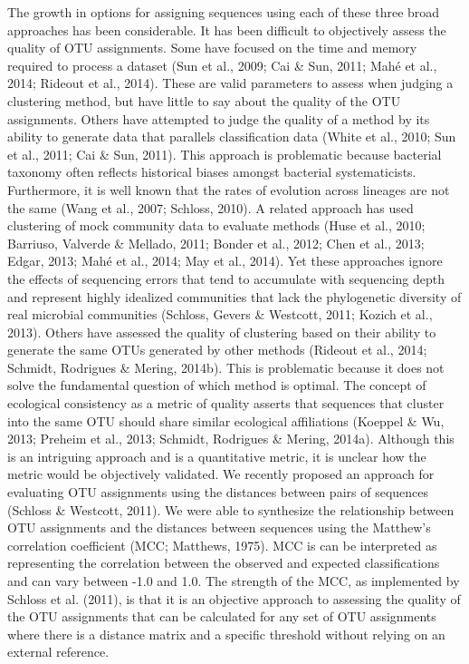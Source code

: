 \documentclass[11pt,]{article}
\begin{document}
The growth in options for assigning sequences using each of these three
broad approaches has been considerable. It has been difficult to
objectively assess the quality of OTU assignments. Some have focused on
the time and memory required to process a dataset (Sun et al., 2009; Cai
\& Sun, 2011; Mahé et al., 2014; Rideout et al., 2014). These are valid
parameters to assess when judging a clustering method, but have little
to say about the quality of the OTU assignments. Others have attempted
to judge the quality of a method by its ability to generate data that
parallels classification data (White et al., 2010; Sun et al., 2011; Cai
\& Sun, 2011). This approach is problematic because bacterial taxonomy
often reflects historical biases amongst bacterial systematicists.
Furthermore, it is well known that the rates of evolution across
lineages are not the same (Wang et al., 2007; Schloss, 2010). A related
approach has used clustering of mock community data to evaluate methods
(Huse et al., 2010; Barriuso, Valverde \& Mellado, 2011; Bonder et al.,
2012; Chen et al., 2013; Edgar, 2013; Mahé et al., 2014; May et al.,
2014). Yet these approaches ignore the effects of sequencing errors that
tend to accumulate with sequencing depth and represent highly idealized
communities that lack the phylogenetic diversity of real microbial
communities (Schloss, Gevers \& Westcott, 2011; Kozich et al., 2013).
Others have assessed the quality of clustering based on their ability to
generate the same OTUs generated by other methods (Rideout et al., 2014;
Schmidt, Rodrigues \& Mering, 2014b). This is problematic because it
does not solve the fundamental question of which method is optimal. The
concept of ecological consistency as a metric of quality asserts that
sequences that cluster into the same OTU should share similar ecological
affiliations (Koeppel \& Wu, 2013; Preheim et al., 2013; Schmidt,
Rodrigues \& Mering, 2014a). Although this is an intriguing approach and
is a quantitative metric, it is unclear how the metric would be
objectively validated. We recently proposed an approach for evaluating
OTU assignments using the distances between pairs of sequences (Schloss
\& Westcott, 2011). We were able to synthesize the relationship between
OTU assignments and the distances between sequences using the Matthew's
correlation coefficient (MCC; Matthews, 1975). MCC is can be interpreted
as representing the correlation between the observed and expected
classifications and can vary between -1.0 and 1.0. The strength of the
MCC, as implemented by Schloss et al. (2011), is that it is an objective
approach to assessing the quality of the OTU assignments that can be
calculated for any set of OTU assignments where there is a distance
matrix and a specific threshold without relying on an external
reference.
\end{document}
